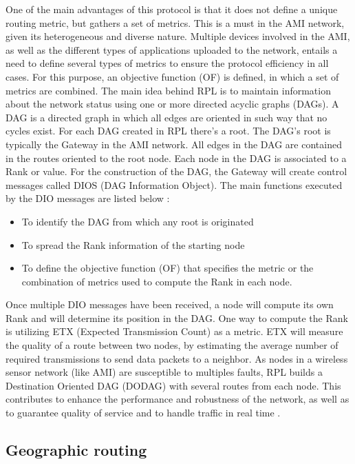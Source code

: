 \documentclass[11pt,final,onecolumn]{IEEEtran}
\begin{document}
One of the main advantages of this protocol is that it does not define a unique routing metric, but gathers a set of metrics. This is a must in the AMI network, given its heterogeneous and diverse nature. Multiple devices involved in the AMI, as well as the different types of applications uploaded to the network, entails a need to define several types of metrics to ensure the protocol efficiency in all cases. For this purpose, an objective function (OF) is defined, in which a set of metrics are combined. 
The main idea behind RPL is to maintain information about the network status using one or more directed acyclic graphs (DAGs). A DAG is a directed graph in which all edges are oriented in such way that no cycles exist. For each DAG created in RPL there’s a root. The DAG’s root is typically the Gateway in the AMI network. All edges in the DAG are contained in the routes oriented to the root node. Each node in the DAG is associated to a Rank or value. For the construction of the DAG, the Gateway will create control messages called DIOS (DAG Information Object). The main functions executed by the DIO messages are listed below  \cite{Iyer2011a}:


\begin{itemize}
	\item To identify the DAG from which any root is originated
	\item To spread the Rank information of the starting node
	\item To define the objective function (OF) that specifies the metric or the combination of metrics used to compute the Rank in each node.
\end{itemize}

Once multiple DIO messages have been received, a node will compute its own Rank and will determine its position in the DAG. One way to compute the Rank is utilizing ETX (Expected Transmission Count) as a metric. ETX will measure the quality of a route between two nodes, by estimating the average number of required transmissions to send data packets to a neighbor. As nodes in a wireless sensor network (like AMI) are susceptible to multiples faults, RPL builds a Destination Oriented DAG (DODAG) with several routes from each node. This contributes to enhance the performance and robustness of the network, as well as to guarantee quality of service and to handle traffic in real time  \cite{Pavkovic2011}.

\subsection{Geographic routing}\label{geographic}
\end{document}
